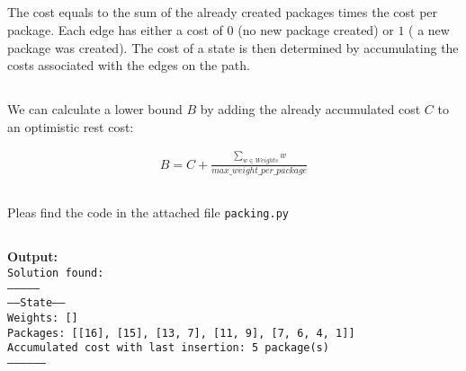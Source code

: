 \documentclass[11pt]{article}
\begin{document}
\subsection{}
The cost equals to the sum of the already created packages times the cost per package. Each edge has either a cost of $0$ (no new package created) or $1$ ( a new package was created). The cost of a state is then determined by accumulating the costs associated with the edges on the path.

\subsection{}
We can calculate a lower bound $B$ by adding the already accumulated cost $C$ to an optimistic rest cost:

\begin{align*}
	B=C + \frac{\displaystyle{\sum_{w\in Weights}w}}{max\_weight\_per\_package}
\end{align*}

\subsection{}
Pleas find the code in the attached file \texttt{packing.py}

\subsection{}
\textbf{Output:}\\
\texttt{Solution found:\\ 
---------------\\
------State------\\
Weights: []\\
Packages: [[16], [15], [13, 7], [11, 9], [7, 6, 4, 1]]\\
Accumulated cost with last insertion: 5 package(s)\\
-----------------\\
}
\end{document}
